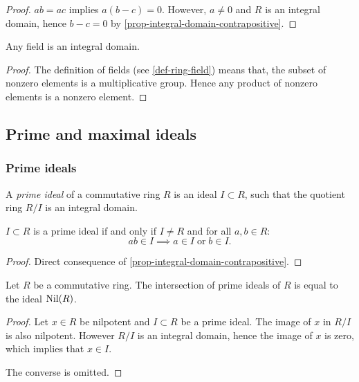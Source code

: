 \documentclass[12pt]{report}
\begin{document}
\begin{proof}
    $ab = ac$ implies $a (b - c) = 0$. However, $a \neq 0$ and $R$ is an integral domain, hence $b - c = 0$ by \ref{prop-integral-domain-contrapositive}.
\end{proof}

\begin{proposition} \label{prop-field-integral-domain}
    Any field is an integral domain.
\end{proposition}

\begin{proof}
    The definition of fields (see \ref{def-ring-field}) means that, the subset of nonzero elements is a multiplicative group. Hence any product of nonzero elements is a nonzero element.
\end{proof}

\subsection{Prime and maximal ideals}
\subsubsection{Prime ideals}

\begin{definition} \label{def-ring-prime-ideal}
    A \emph{prime ideal} of a commutative ring $R$ is an ideal $I \subset R$, such that the quotient ring $R / I$ is an integral domain.
\end{definition}

\begin{proposition} \label{prop-ring-prime-ideal-eq}
    $I \subset R$ is a prime ideal if and only if $I \neq R$ and for all $a, b \in R$:
    \[
        ab \in I \implies a \in I \; \text{or} \; b \in I.
    \]
\end{proposition}

\begin{proof}
    Direct consequence of \ref{prop-integral-domain-contrapositive}.
\end{proof}

\begin{proposition} \label{prop-ring-prime-ideals-intersection}
    Let $R$ be a commutative ring. The intersection of prime ideals of $R$ is equal to the ideal $\operatorname{Nil} (R)$.
\end{proposition}

\begin{proof}
    Let $x \in R$ be nilpotent and $I \subset R$ be a prime ideal. The image of $x$ in $R / I$ is also nilpotent. However $R / I$ is an integral domain, hence the image of $x$ is zero, which implies that $x \in I$.
    
    The converse is omitted.
\end{proof}
\end{document}
